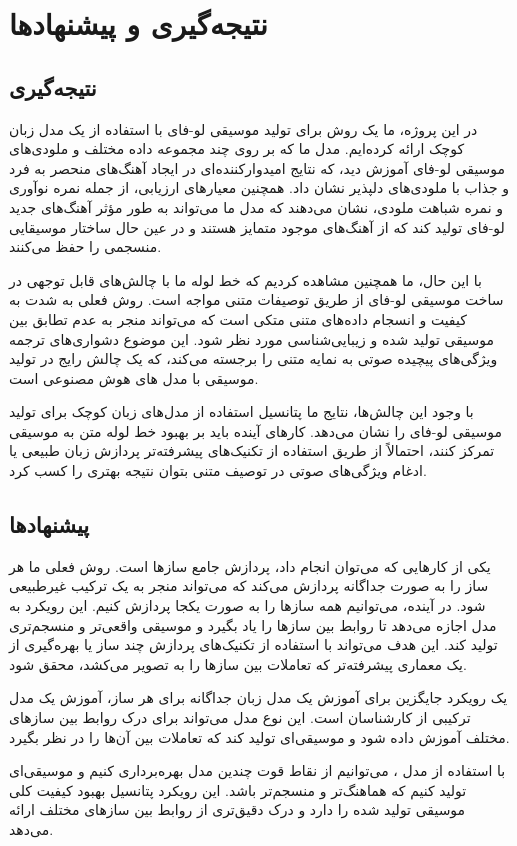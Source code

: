 
\chapter{نتیجه‌گیری و پیشنهادها}
\section{‌نتیجه‌گیری}

در این پروژه، ما یک روش برای تولید موسیقی لو-فای با استفاده از یک مدل زبان کوچک ارائه کرده‌ایم. مدل ما که بر روی چند مجموعه داده مختلف و ملودی‌های موسیقی لو-فای آموزش دید، که نتایج امیدوارکننده‌ای در ایجاد آهنگ‌های منحصر به فرد و جذاب با ملودی‌های دلپذیر نشان داد. همچنین معیارهای ارزیابی، از جمله نمره نوآوری و نمره شباهت ملودی، نشان می‌دهند که مدل ما می‌تواند به طور مؤثر آهنگ‌های جدید لو-فای تولید کند که از آهنگ‌های موجود متمایز هستند و در عین حال ساختار موسیقایی منسجمی را حفظ می‌کنند.

با این حال، ما همچنین مشاهده کردیم که خط لوله ما با چالش‌های قابل توجهی در ساخت موسیقی لو-فای از طریق توصیفات متنی مواجه است. روش فعلی به شدت به کیفیت و انسجام داده‌های متنی متکی است که می‌تواند منجر به عدم تطابق بین موسیقی تولید شده و زیبایی‌شناسی مورد نظر شود. این موضوع دشواری‌های ترجمه ویژگی‌های پیچیده صوتی به نمایه متنی را برجسته می‌کند، که یک چالش رایج در تولید موسیقی با مدل های هوش‌ مصنوعی است.

با وجود این چالش‌ها، نتایج ما پتانسیل استفاده از مدل‌های زبان کوچک برای تولید موسیقی لو-فای را نشان می‌دهد. کارهای آینده باید بر بهبود خط لوله متن به موسیقی تمرکز کنند، احتمالاً از طریق استفاده از تکنیک‌های پیشرفته‌تر پردازش زبان طبیعی یا ادغام ویژگی‌های صوتی در توصیف متنی بتوان نتیجه بهتری را کسب کرد.


\section{پیشنهادها}

یکی از کارهایی که می‌توان انجام داد، پردازش جامع سازها است. روش فعلی ما هر ساز را به صورت جداگانه پردازش می‌کند که می‌تواند منجر به یک ترکیب غیرطبیعی شود. در آینده، می‌توانیم همه سازها را به صورت یکجا پردازش کنیم. این رویکرد به مدل اجازه می‌دهد تا روابط بین سازها را یاد بگیرد و موسیقی واقعی‌تر و منسجم‌تری تولید کند. این هدف می‌تواند با استفاده از تکنیک‌های پردازش چند ساز یا بهره‌گیری از یک معماری پیشرفته‌تر که تعاملات بین سازها را به تصویر می‌کشد، محقق شود.

یک رویکرد جایگزین برای آموزش یک مدل زبان جداگانه برای هر ساز، آموزش یک مدل ترکیبی از کارشناسان  \cite{cai2024survey} است. این نوع مدل می‌تواند برای درک روابط بین سازهای مختلف آموزش داده شود و موسیقی‌ای تولید کند که تعاملات بین آن‌ها را در نظر بگیرد.

با استفاده از مدل ، می‌توانیم از نقاط قوت چندین مدل بهره‌برداری کنیم و موسیقی‌ای تولید کنیم که هماهنگ‌تر و منسجم‌تر باشد. این رویکرد پتانسیل بهبود کیفیت کلی موسیقی تولید شده را دارد و درک دقیق‌تری از روابط بین سازهای مختلف ارائه می‌دهد.
